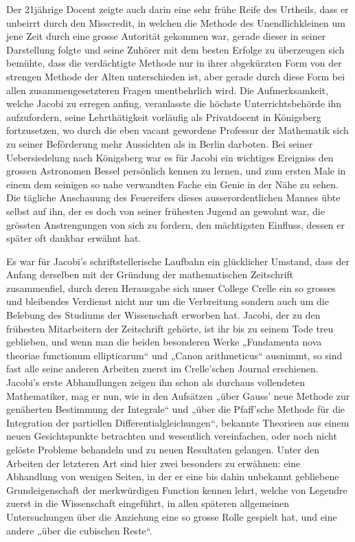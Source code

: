 \documentclass[11pt]{article}
\begin{document}
Der 21jährige Docent zeigte auch darin eine sehr frühe Reife des Urtheils, dass er unbeirrt durch den Misscredit, in welchen die Methode des Unendlichkleinen um jene Zeit durch eine grosse Autorität gekommen war, gerade dieser in seiner Darstellung folgte und seine Zuhörer mit dem besten Erfolge zu überzeugen sich bemühte, dass die verdächtigte Methode nur in ihrer abgekürzten Form von der strengen Methode der Alten unterschieden ist, aber gerade durch diese Form bei allen zusammengesetzteren Fragen unentbehrlich wird. Die Aufmerksamkeit, welche Jacobi zu erregen anfing, veranlasste die höchste Unterrichtsbehörde ihn aufzufordern, seine Lehrthätigkeit vorläufig als Privatdocent in Königsberg fortzusetzen, wo durch die eben vacant gewordene Professur der Mathematik sich zu seiner Beförderung mehr Aussichten als in Berlin darboten. Bei seiner Uebersiedelung nach Königsberg war es für Jacobi ein wichtiges Ereigniss den grossen Astronomen Bessel persönlich kennen zu lernen, und zum ersten Male in einem dem seinigen so nahe verwandten Fache ein Genie in der Nähe zu sehen. Die tägliche Anschauung des Feuereifers dieses ausserordentlichen Mannes übte selbst auf ihn, der es doch von seiner frühesten Jugend an gewohnt war, die grössten Anstrengungen von sich zu fordern, den mächtigsten Einfluss, dessen er später oft dankbar erwähnt hat.

Es war für Jacobi’s schriftstellerische Laufbahn ein glücklicher Umstand, dass der Anfang derselben mit der Gründung der mathematischen Zeitschrift zusammenfiel, durch deren Herausgabe sich unser College Crelle ein so grosses und bleibendes Verdienst nicht nur um die Verbreitung sondern auch um die Belebung des Studiums der Wissenschaft erworben hat. Jacobi, der zu den frühesten Mitarbeitern der Zeitschrift gehörte, ist ihr bis zu seinem Tode treu geblieben, und wenn man die beiden besonderen Werke „Fundamenta nova theoriae functionum ellipticarum“ und „Canon arithmeticus“ ausnimmt, so sind fast alle seine anderen Arbeiten zuerst im Crelle’schen Journal erschienen. Jacobi's erste Abhandlungen zeigen ihn schon als durchaus vollendeten Mathematiker, mag er nun, wie in den Aufsätzen „über Gauss’ neue Methode zur genäherten Bestimmung der Integrale“ und „über die Pfaff’sche Methode für die Integration der partiellen Differentialgleichungen“, bekannte Theorieen aus einem neuen Gesichtspunkte betrachten und wesentlich vereinfachen, oder noch nicht gelöste Probleme behandeln und zu neuen Resultaten gelangen. Unter den Arbeiten der letzteren Art sind hier zwei besonders zu erwähnen: eine Abhandlung von wenigen Seiten, in der er eine bis dahin unbekannt gebliebene Grundeigenschaft der merkwürdigen Function kennen lehrt, welche von Legendre zuerst in die Wissenschaft eingeführt, in allen späteren allgemeinen Untersuchungen über die Anziehung eine so grosse Rolle gespielt hat, und eine andere „über die cubischen Reste“.
\end{document}
